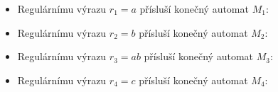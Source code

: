 \documentclass[a4paper,11pt]{article}[24.3.2010]
\begin{document}
\begin{enumerate}
\begin{enumerate}
\begin{itemize}
        \item Regulárnímu výrazu $r_{1}=a$ přísluší konečný automat $M_{1}$:
        \begin{figure}[h!]
        \begin{center}
        \end{center}
        \end{figure}
        \item Regulárnímu výrazu $r_{2}=b$ přísluší konečný automat $M_{2}$: 
        \begin{figure}[h!]
        \begin{center}
        \end{center}
        \end{figure}
        \item Regulárnímu výrazu $r_{3}=ab$ přísluší konečný automat $M_{3}$:
        \begin{figure}[h!]
        \begin{center}
        \end{center}
        \end{figure}
        \item Regulárnímu výrazu $r_{4}=c$ přísluší konečný automat $M_{4}$:
        \begin{figure}[h!]
        \begin{center}
        \end{center}
        \end{figure}

\end{itemize}
\end{enumerate}
\end{enumerate}
\end{document}
